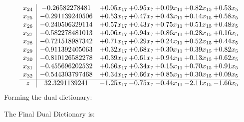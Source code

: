\documentclass[8pt]{article}
\begin{document}
\[\begin{array}{c| c c@{\hskip 2pt} c@{\hskip 2pt} c@{\hskip 2pt} c@{\hskip 2pt} c@{\hskip 2pt} }
 x_{24}   &  -0.26582278481 & +  0.05 x_{17} & +  0.95 x_{7} & +  0.09 x_{11} & +  0.82 x_{15} & +  0.53 x_{5}\\
 x_{25}   &  -0.291139240506 & +  0.53 x_{17} & +  0.47 x_{7} & +  0.43 x_{11} & +  0.14 x_{15} & +  0.58 x_{5}\\
 x_{26}   &  -0.240506329114 & +  0.57 x_{17} & +  0.43 x_{7} & +  0.75 x_{11} & +  0.51 x_{15} & +  0.48 x_{5}\\
 x_{27}   &  -0.582278481013 & +  0.06 x_{17} & +  0.94 x_{7} & +  0.86 x_{11} & +  0.28 x_{15} & +  0.16 x_{5}\\
 x_{28}   &  -0.721518987342 & +  0.71 x_{17} & +  0.29 x_{7} & +  0.24 x_{11} & +  0.52 x_{15} & +  0.44 x_{5}\\
 x_{29}   &  -0.911392405063 & +  0.32 x_{17} & +  0.68 x_{7} & +  0.30 x_{11} & +  0.39 x_{15} & +  0.82 x_{5}\\
 x_{30}   &  -0.810126582278 & +  0.39 x_{17} & +  0.61 x_{7} & +  0.94 x_{11} & +  0.13 x_{15} & +  0.62 x_{5}\\
 x_{31}   &  -0.455696202532 & +  0.66 x_{17} & +  0.34 x_{7} & +  0.15 x_{11} & +  0.70 x_{15} & +  0.91 x_{5}\\
 x_{32}   &  -0.544303797468 & +  0.34 x_{17} & +  0.66 x_{7} & +  0.85 x_{11} & +  0.30 x_{15} & +  0.09 x_{5}\\
\hline
z    &  32.3291139241 & -1.25 x_{17} & -0.75 x_{7} & -0.44 x_{11} & -2.11 x_{15} & -1.66 x_{5}\\
\end{array}\]
Forming the dual dictionary:

The Final Dual Dictionary is: 
\end{document}
